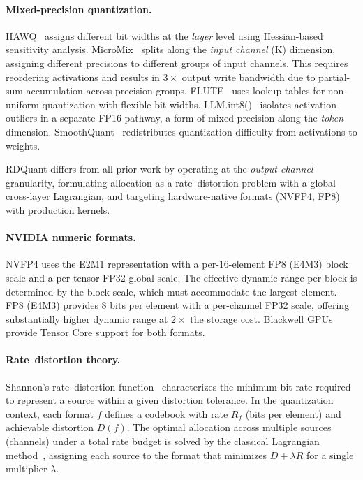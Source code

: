 \documentclass{article}
\begin{document}
\paragraph{Mixed-precision quantization.}
HAWQ~\cite{dong2019hawq} assigns different bit widths at the \emph{layer} level using Hessian-based sensitivity analysis.
MicroMix~\cite{yi2024micromix} splits along the \emph{input channel} (K) dimension, assigning different precisions to different groups of input channels.
This requires reordering activations and results in $3\times$ output write bandwidth due to partial-sum accumulation across precision groups.
FLUTE~\cite{guo2024flute} uses lookup tables for non-uniform quantization with flexible bit widths.
LLM.int8()~\cite{dettmers2022gpt3int8} isolates activation outliers in a separate FP16 pathway, a form of mixed precision along the \emph{token} dimension.
SmoothQuant~\cite{xiao2023smoothquant} redistributes quantization difficulty from activations to weights.

RDQuant differs from all prior work by operating at the \emph{output channel} granularity, formulating allocation as a rate--distortion problem with a global cross-layer Lagrangian, and targeting hardware-native formats (NVFP4, FP8) with production kernels.

\paragraph{NVIDIA numeric formats.}
NVFP4 uses the E2M1 representation with a per-16-element FP8 (E4M3) block scale and a per-tensor FP32 global scale.
The effective dynamic range per block is determined by the block scale, which must accommodate the largest element.
FP8 (E4M3) provides 8 bits per element with a per-channel FP32 scale, offering substantially higher dynamic range at $2\times$ the storage cost.
Blackwell GPUs provide Tensor Core support for both formats.

\paragraph{Rate--distortion theory.}
Shannon's rate--distortion function~\cite{shannon1959coding} characterizes the minimum bit rate required to represent a source within a given distortion tolerance.
In the quantization context, each format $f$ defines a codebook with rate $R_f$ (bits per element) and achievable distortion $D(f)$.
The optimal allocation across multiple sources (channels) under a total rate budget is solved by the classical Lagrangian method~\cite{cover2006elements}, assigning each source to the format that minimizes $D + \lambda R$ for a single multiplier $\lambda$.
\end{document}
